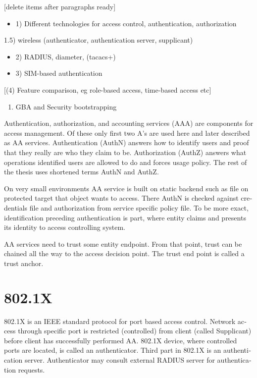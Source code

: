 \documentclass[12pt,a4paper,english]{tutthesis}
\begin{document}
\begin{otherlanguage}{english}
[delete items after paragraphs ready]
\begin{itemize}
\item 1) Different technologies for access control, authentication,
authorization
\end{itemize}
1.5) wireless (authenticator, authentication server, supplicant)
\begin{itemize}
\item 2) RADIUS, diameter, (tacacs+)
\item 3) SIM-based authentication
\end{itemize}
[(4) Feature comparison, eg role-based access, time-based access etc]
\begin{enumerate}
\item GBA and Security bootstrapping
\end{enumerate}

Authentication, authorization, and accounting services (AAA) are
components for access management. Of these only first two A's are used
here and later described as AA services. Authentication (AuthN)
answers how to identify users and proof that they really are
who they claim to be. Authorization (AuthZ) answers what operations
identified users are allowed to do and forces usage policy. The rest of the thesis uses
shortened terms AuthN and AuthZ.

On very small environments AA service is built on static backend such
as file on protected target that object wants to access. There AuthN
is checked against credentials file and authorization from service
specific policy file. 
To be more exact, identification preceding authentication is part,
where entity claims and presents its identity to 
access controlling system.

AA services need to trust some entity endpoint. From that point, trust
can be chained all the way to the access decision point. The trust end
point is called a trust anchor.


\section{802.1X}
\label{sec-2-1}

802.1X is an IEEE standard protocol for port based access
control. Network access through specific port is
restricted (controlled) from client (called Supplicant) before
client has successfully performed AA. 802.1X device, where controlled ports
are located, is called an authenticator. Third part in 802.1X is an
authentication server. Authenticator may consult external RADIUS
server for authentication requests. 



\end{otherlanguage}
\end{document}
